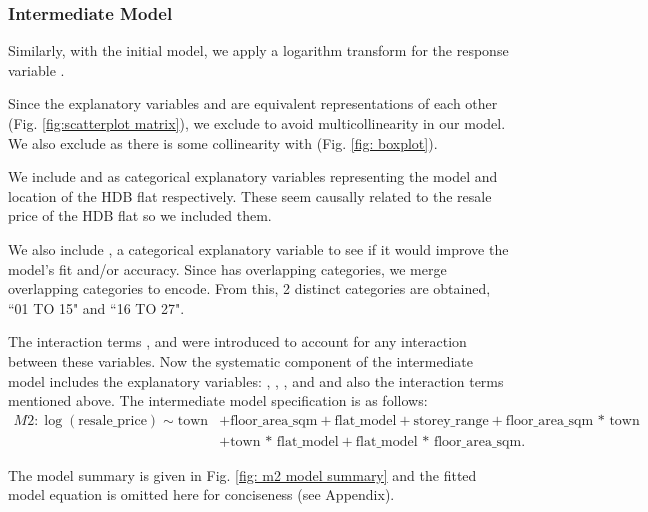 \subsubsection{Intermediate Model}

Similarly, with the initial model, we apply a logarithm transform for the response variable .

Since the explanatory variables  and  are equivalent representations of each other (Fig. \ref{fig:scatterplot matrix}), we exclude  to avoid multicollinearity in our model. We also exclude  as there is some collinearity with  (Fig. \ref{fig: boxplot}).

We include  and  as categorical explanatory variables representing the model and location of the HDB flat respectively. These seem causally related to the resale price of the HDB flat so we included them.

We also include , a categorical explanatory variable to see if it would improve the model's fit and/or accuracy. Since  has overlapping categories, we merge overlapping categories to encode. From this, 2 distinct categories are obtained, ``01 TO 15" and ``16 TO 27".

The interaction terms ,  and  were introduced to account for any interaction between these variables. Now the systematic component of the intermediate model includes the explanatory variables: , \newline{}, , and  and also the interaction terms mentioned above.
The intermediate model specification is as follows:
\begin{align*}
M2: \log(\text{resale\_price}) \sim \text{town} &+ \text{floor\_area\_sqm} + \text{flat\_model} + \text{storey\_range} + \text{floor\_area\_sqm * town} \\ &+ \text{town * flat\_model} + \text{flat\_model * floor\_area\_sqm}.
\end{align*}

\newpage

The model summary is given in Fig. \ref{fig: m2 model summary} and the fitted model equation is omitted here for conciseness (see Appendix).

